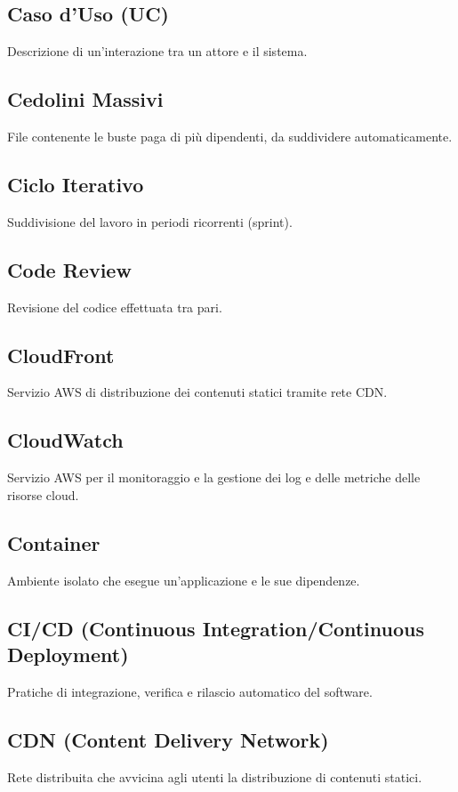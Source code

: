 \documentclass[a4paper,12pt]{article}
\begin{document}
\subsection{Caso d'Uso (UC)}
Descrizione di un'interazione tra un attore e il sistema.

\subsection{Cedolini Massivi}
File contenente le buste paga di più dipendenti, da suddividere automaticamente.

\subsection{Ciclo Iterativo}
Suddivisione del lavoro in periodi ricorrenti (sprint).

\subsection{Code Review}
Revisione del codice effettuata tra pari.

\subsection{CloudFront}
Servizio AWS di distribuzione dei contenuti statici tramite rete CDN.

\subsection{CloudWatch}
Servizio AWS per il monitoraggio e la gestione dei log e delle metriche delle risorse cloud.

\subsection{Container}
Ambiente isolato che esegue un'applicazione e le sue dipendenze.

\subsection{CI/CD (Continuous Integration/Continuous Deployment)}
Pratiche di integrazione, verifica e rilascio automatico del software.

\subsection{CDN (Content Delivery Network)}
Rete distribuita che avvicina agli utenti la distribuzione di contenuti statici.
\end{document}
